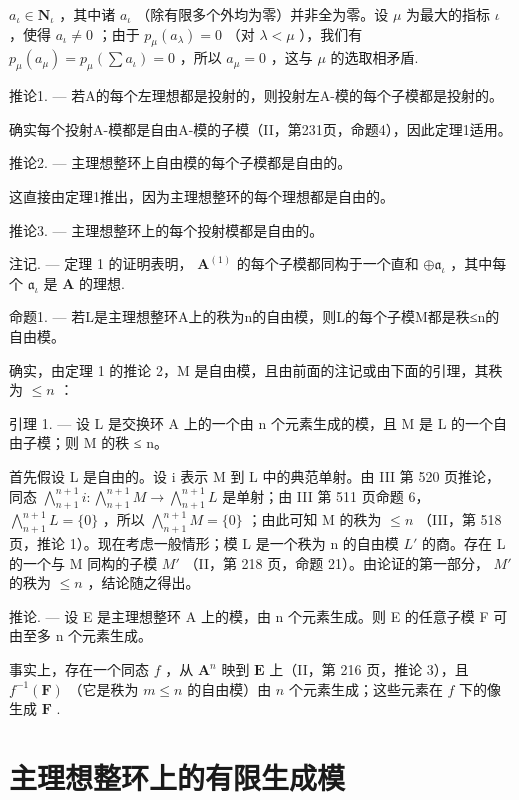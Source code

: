 \(a_{\iota} \in \mathbf{N}_{\iota}\) ，其中诸 \(a_{\iota}\) （除有限多个外均为零）并非全为零。设 \(\mu\) 为最大的指标 \(\iota\) ，使得 \(a_{\iota} \neq 0\) ；由于 \(p_{\mu}(a_{\lambda}) = 0\) （对 \(\lambda < \mu\) ），我们有 \(p_{\mu}(a_{\mu}) = p_{\mu}\left(\sum a_{\iota}\right) = 0\) ，所以 \(a_{\mu} = 0\) ，这与 \(\mu\) 的选取相矛盾.

推论1. --- 若A的每个左理想都是投射的，则投射左A-模的每个子模都是投射的。

确实每个投射A-模都是自由A-模的子模（II，第231页，命题4），因此定理1适用。

推论2. --- 主理想整环上自由模的每个子模都是自由的。

这直接由定理1推出，因为主理想整环的每个理想都是自由的。

推论3. --- 主理想整环上的每个投射模都是自由的。

注记. --- 定理 1 的证明表明， \(\mathbf{A}^{(1)}\) 的每个子模都同构于一个直和 \(\oplus \mathfrak{a}_{\iota}\) ，其中每个 \(\mathfrak{a}_{\iota}\) 是 \(\mathbf{A}\) 的理想.

命题1. --- 若L是主理想整环A上的秩为n的自由模，则L的每个子模M都是秩≤n的自由模。

确实，由定理 1 的推论 2，M 是自由模，且由前面的注记或由下面的引理，其秩为 \(\leqslant n\) ：

引理 1. --- 设 L 是交换环 A 上的一个由 n 个元素生成的模，且 M 是 L 的一个自由子模；则 M 的秩 ≤ n。

首先假设 L 是自由的。设 i 表示 M 到 L 中的典范单射。由 III 第 520 页推论，同态 \(\bigwedge_{n+1}^{n+1} i: \bigwedge_{n+1}^{n+1} M \to \bigwedge_{n+1}^{n+1} L\) 是单射；由 III 第 511 页命题 6， \(\bigwedge_{n+1}^{n+1} L = \{0\}\) ，所以 \(\bigwedge_{n+1}^{n+1} M = \{0\}\) ；由此可知 M 的秩为 \(\leqslant n\) （III，第 518 页，推论 1）。现在考虑一般情形；模 L 是一个秩为 n 的自由模 \(L'\) 的商。存在 L 的一个与 M 同构的子模 \(M'\) （II，第 218 页，命题 21）。由论证的第一部分， \(M'\) 的秩为 \(\leqslant n\) ，结论随之得出。

推论. --- 设 E 是主理想整环 A 上的模，由 n 个元素生成。则 E 的任意子模 F 可由至多 n 个元素生成。

事实上，存在一个同态 \(f\) ，从 \(\mathbf{A}^n\) 映到 \(\mathbf{E}\) 上（II，第 216 页，推论 3），且 \(f^{-1}(\mathbf{F})\) （它是秩为 \(m \leqslant n\) 的自由模）由 \(n\) 个元素生成；这些元素在 \(f\) 下的像生成 \(\mathbf{F}\) .

\section{主理想整环上的有限生成模}

